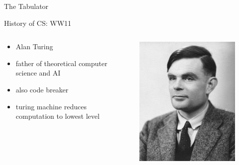 \documentclass[xcolor={dvipsnames}]{beamer}
\begin{document}
\begin{frame}{The Tabulator}
	\begin{center}
	\href{http://channel.nationalgeographic.com/channel/the-link/videos/the-tabulator/}{}
	\end{center}
\end{frame}

\begin{frame}{History of CS: WW11}
	\begin{columns}
	 \begin{column}{.49\textwidth}
			\begin{itemize}
				\item Alan Turing
				\item father of theoretical computer science and AI
				\item also code breaker
				\item turing machine reduces computation to lowest level
			\end{itemize}
 	\end{column}
	 \begin{column}{.49\textwidth}
  		\begin{figure}
 		\includegraphics{Alan_Turing_photo}
		\end{figure}
	\end{column}
\end{columns}
\end{frame}
\end{document}
